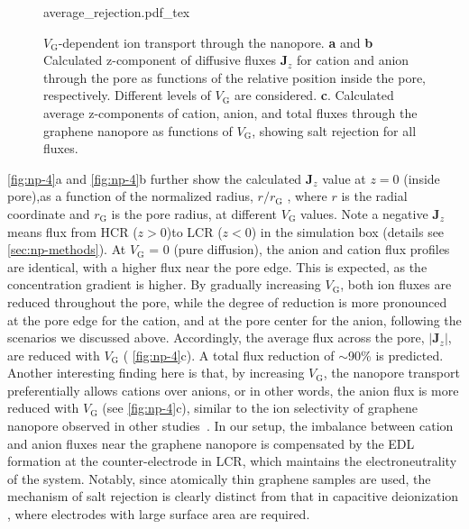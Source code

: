 \begin{figure}[!htbp]
  \centering
   {average_rejection.pdf_tex}
   \caption{ $V_{\mathrm{G}}$-dependent ion transport through the
       nanopore.  \textbf{a} and \textbf{b} Calculated z-component of
       diffusive fluxes $\symbf{J}_{z}$ for cation and anion through
       the pore as functions of the relative position inside the pore,
       respectively.  Different levels of $V_{\mathrm{G}}$ are
       considered. \textbf{c}. Calculated average z-components of
       cation, anion, and total fluxes through the graphene nanopore
       as functions of $V_{\mathrm{G}}$, showing salt rejection for
       all fluxes.}
  \label{fig:np-4}
\end{figure}
%
\autoref{fig:np-4}a and \autoref{fig:np-4}b further show the calculated $\symbf{J}_{z}$ value
at $z=0$ (inside pore),as a function of the normalized radius, $r/r_{\mathrm{G}}$ ,
where $r$ is the radial coordinate and $r_{\mathrm{G}}$ is the pore
radius, at different $V_{\mathrm{G}}$ values. Note a negative
$\symbf{J}_{z}$ means flux from HCR ($z>0$)to LCR ($z<0$) in the
simulation box (details see \autoref{sec:np-methods}).
%
At $V_{\mathrm{G}}$ = 0 (pure
diffusion), the anion and cation flux profiles are identical, with a
higher flux near the pore edge.
This is expected, as the
concentration gradient is higher.
%
By gradually increasing
$V_{\mathrm{G}}$, both ion fluxes are reduced throughout the pore, while
the degree of reduction is more pronounced at the pore edge for the
cation, and at the pore center for the anion, following the scenarios
we discussed above. Accordingly, the average flux across the
pore, $|\symbf{J}_{z}|$, are reduced with $V_{\mathrm{G}}$ (
\autoref{fig:np-4}c). A total flux reduction of $\sim$90\% is
predicted. Another interesting finding here is that, by increasing
$V_{\mathrm{G}}$, the nanopore transport preferentially allows cations
over anions, or in other words, the anion flux is more reduced with
$V_{\mathrm{G}}$ (see \autoref{fig:np-4}c), similar to the ion
selectivity of graphene nanopore observed in other studies~\cite{Rollings_2016_gating}.
%
In our
setup, the imbalance between cation and anion fluxes near the graphene
nanopore is compensated by the EDL formation at the counter-electrode
in LCR, which maintains the electroneutrality of the system. Notably,
since atomically thin graphene samples are used, the mechanism of salt
rejection is clearly distinct from that in capacitive deionization
\cite{Biesheuvel_2010_desalin_theory}, where electrodes with large
surface area are required.


